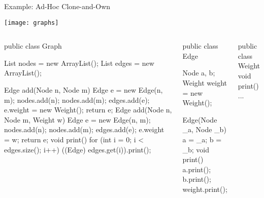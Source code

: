 \begin{frame}[fragile]{Example: Ad-Hoc Clone-and-Own}
	\vspace{-1.2cm}
	\begin{flushright}
		\texttt{[image: graphs]}		
	\end{flushright}
	\vspace{0.1cm}
	\begin{tiny}
		\begin{columns}
				\vspace{-15mm}
\vspace{3mm}				
\begin{codetight}{}
public class Graph {
	List nodes = new ArrayList();
	List edges = new ArrayList();

	Edge add(Node n, Node m) {
		Edge e = new Edge(n, m);
		nodes.add(n); nodes.add(m); edges.add(e);
		e.weight = new Weight();
		return e;
	}
	Edge add(Node n, Node m, Weight w) {
		Edge e = new Edge(n, m);
		nodes.add(n); nodes.add(m); edges.add(e);
		e.weight = w;
		return e;
	}
	void print() {
		for (int i = 0; i < edges.size(); i++) {
			((Edge) edges.get(i)).print();
		}
	}
}
\end{codetight}
\begin{codetight}{}
public class Edge {
	Node a, b;
	Weight weight = new Weight();

	Edge(Node _a, Node _b) {
		a = _a; b = _b;
	}
	void print() {
		a.print(); b.print();
		weight.print();
	}
}
\end{codetight}
\begin{codetight}{}
public class Weight {
	void print() {...}
}
\end{codetight}
		\end{columns}
	\end{tiny}
\end{frame}

